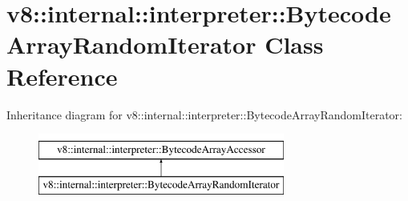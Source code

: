 \hypertarget{classv8_1_1internal_1_1interpreter_1_1BytecodeArrayRandomIterator}{}\section{v8\+:\+:internal\+:\+:interpreter\+:\+:Bytecode\+Array\+Random\+Iterator Class Reference}
\label{classv8_1_1internal_1_1interpreter_1_1BytecodeArrayRandomIterator}
Inheritance diagram for v8\+:\+:internal\+:\+:interpreter\+:\+:Bytecode\+Array\+Random\+Iterator\+:\begin{figure}[H]
\begin{center}
\leavevmode
\includegraphics[height=2.000000cm]{classv8_1_1internal_1_1interpreter_1_1BytecodeArrayRandomIterator}
\end{center}
\end{figure}
